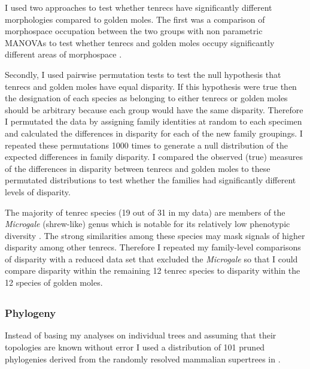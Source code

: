 	I used two approaches to test whether tenrecs have significantly different morphologies compared to golden moles. The first was a comparison of morphospace occupation between the two groups with non parametric MANOVAs \citep{Anderson2001} to test whether tenrecs and golden moles occupy significantly different areas of morphospace \citep[e.g][]{Serb2011, Ruta2013}. 
	
	Secondly, I used pairwise permutation tests to test the null hypothesis that tenrecs and golden moles have equal disparity. If this hypothesis were true then the designation of each species as belonging to either tenrecs or golden moles should be arbitrary because each group would have the same disparity. Therefore I permutated the data by assigning family identities at random to each specimen and calculated the differences in disparity for each of the new family groupings. I repeated these permutations 1000 times to generate a null distribution of the expected differences in family disparity. I compared the observed (true) measures of the differences in disparity between tenrecs and golden moles to these permutated distributions to test whether the families had significantly different levels of disparity.

	The majority of tenrec species (19 out of 31 in my data) are members of the \textit{Microgale} (shrew-like) genus which is notable for its relatively low phenotypic diversity \citep{ Soarimalala2011, Jenkins2003}. The strong similarities among these species may mask signals of higher disparity among other tenrecs. Therefore I repeated my family-level comparisons of disparity with a reduced data set that excluded the \textit{Microgale} so that I could compare disparity within the remaining 12 tenrec species to disparity within the 12 species of golden moles.



\subsection{}



\subsubsection{Phylogeny} %
	Instead of basing my analyses on individual trees and assuming that their topologies are known without error \citep[e.g.][]{Ruta2013, Foth2012, Brusatte2008, Harmon2003} I used a distribution of 101 pruned phylogenies derived from the randomly resolved mammalian supertrees in \citep{Kuhn2011}. 

